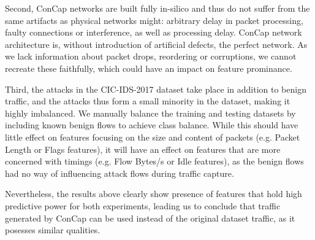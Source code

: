 Second, ConCap networks are built fully in-silico and thus do not suffer from the same artifacts as physical networks might: arbitrary delay in packet processing, faulty connections or interference, as well as processing delay. ConCap network architecture is, without introduction of artificial defects, the perfect network. As we lack information about packet drops, reordering or corruptions, we cannot recreate these faithfully, which could have an impact on feature prominance.

Third, the attacks in the CIC-IDS-2017 dataset take place in addition to benign traffic, and the attacks thus form a small minority in the dataset, making it highly imbalanced. We manually balance the training and testing datasets by including known benign flows to achieve class balance. While this should have little effect on features focusing on the size and content of packets (e.g. Packet Length or Flags features), it will have an effect on features that are more concerned with timings (e.g. Flow Bytes/s or Idle features), as the benign flows had no way of influencing attack flows during traffic capture. 

Nevertheless, the results above clearly show presence of features that hold high predictive power for both experiments, leading us to conclude that traffic generated by ConCap can be used instead of the original dataset traffic, as it posesses similar qualities.